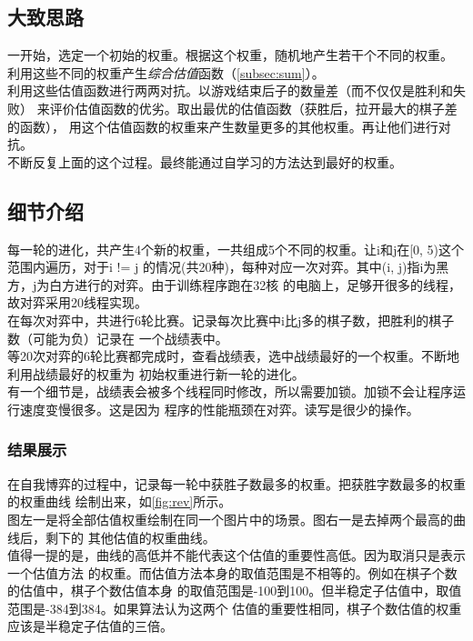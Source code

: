\documentclass[a4paper]{article}
\begin{document}
\subsection{大致思路}
一开始，选定一个初始的权重。根据这个权重，随机地产生若干个不同的权重。
利用这些不同的权重产生\emph{综合估值}函数（\autoref{subsec:sum}）。\\

利用这些估值函数进行两两对抗。以游戏结束后子的数量差（而不仅仅是胜利和失败）
来评价估值函数的优劣。取出最优的估值函数（获胜后，拉开最大的棋子差的函数），
用这个估值函数的权重来产生数量更多的其他权重。再让他们进行对抗。\\

不断反复上面的这个过程。最终能通过自学习的方法达到最好的权重。

\subsection{细节介绍}
每一轮的进化，共产生4个新的权重，一共组成5个不同的权重。让i和j在[0, 5)这个范围内遍历，对于i != j
的情况(共20种)，每种对应一次对弈。其中(i, j)指i为黑方，j为白方进行的对弈。由于训练程序跑在32核
的电脑上，足够开很多的线程，故对弈采用20线程实现。\\

在每次对弈中，共进行6轮比赛。记录每次比赛中i比j多的棋子数，把胜利的棋子数（可能为负）记录在
一个战绩表中。\\

等20次对弈的6轮比赛都完成时，查看战绩表，选中战绩最好的一个权重。不断地利用战绩最好的权重为
初始权重进行新一轮的进化。\\

有一个细节是，战绩表会被多个线程同时修改，所以需要加锁。加锁不会让程序运行速度变慢很多。这是因为
程序的性能瓶颈在对弈。读写是很少的操作。
\subsubsection{结果展示}
在自我博弈的过程中，记录每一轮中获胜子数最多的权重。把获胜字数最多的权重的权重曲线
绘制出来，如\autoref{fig:rev}所示。\\

图左一是将全部估值权重绘制在同一个图片中的场景。图右一是去掉两个最高的曲线后，剩下的
其他估值的权重曲线。\\

值得一提的是，曲线的高低并不能代表这个估值的重要性高低。因为取消只是表示一个估值方法
的权重。而估值方法本身的取值范围是不相等的。例如在棋子个数的估值中，棋子个数估值本身
的取值范围是-100到100。但半稳定子估值中，取值范围是-384到384。如果算法认为这两个
估值的重要性相同，棋子个数估值的权重应该是半稳定子估值的三倍。\\
\end{document}
